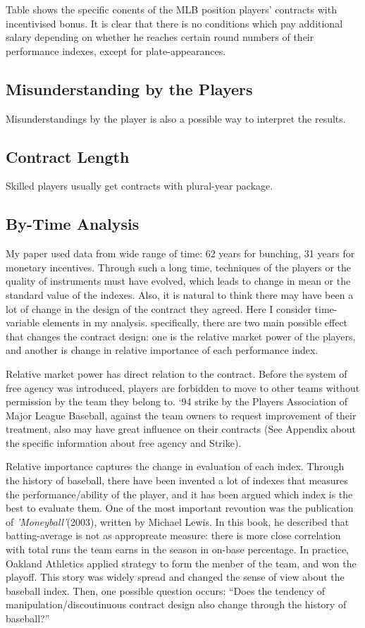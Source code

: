 \documentclass[dvipdfmx, 12pt]{article}
\begin{document}
Table %
shows the specific conents of the MLB position players' contracts with incentivised bonus. It is clear that there is no conditions which pay additional salary depending on whether he reaches certain round numbers of their performance indexes, except for plate-appearances.

\subsection{Misunderstanding by the Players}

Misunderstandings by the player is also a possible way to interpret the results.

\subsection{Contract Length}

Skilled players usually get contracts with plural-year package.

\subsection{By-Time Analysis}

My paper used data from wide range of time: 62 years for bunching, 31 years for monetary incentives. Through such a long time, techniques of the players or the quality of instruments must have evolved, which leads to change in mean or the standard value of the indexes. Also, it is natural to think there may have been a lot of change in the design of the contract they agreed. Here I consider time-variable elements in my analysis. specifically, there are two main possible effect that changes the contract design: one is the relative market power of the players, and another is change in relative importance of each performance index.

Relative market power has direct relation to the contract. Before the system of free agency was introduced, players are forbidden to move to other teams without permission by the team they belong to. `94 strike by the Players Association of Major League Baseball, against the team owners to request improvement of their treatment, also may have great influence on their contracts (See Appendix about the specific information about free agency and Strike).

Relative importance captures the change in evaluation of each index. Through the history of baseball, there have been invented a lot of indexes that measures the performance/ability of the player, and it has been argued which index is the best to evaluate them. One of the most important revoution was the publication of \textit{'Moneyball'}(2003), written by Michael Lewis. In this book, he described that batting-average is not as appropreate measure: there is more close correlation with total runs the team earns in the season in on-base percentage. In practice, Oakland Athletics applied strategy to form the menber of the team, and won the playoff. This story was widely spread and changed the sense of view about the baseball index. Then, one possible question occurs: ``Does the tendency of manipulation/discoutinuous contract design also change through the history of baseball?''
\end{document}
